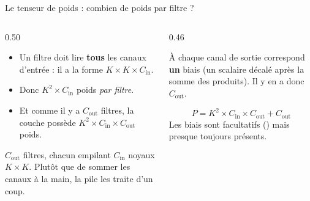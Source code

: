 \begin{frame}{Le tenseur de poids : combien de poids par filtre ?}
\begin{columns}[t]
\begin{column}{0.50\textwidth}
\begin{itemize}
  \item Un filtre doit lire \textbf{tous} les canaux d'entrée :
  il a la forme $K \times K \times C_{\text{in}}$.
  \item Donc $K^2 \times C_{\text{in}}$ poids \emph{par filtre}.
  \item Et comme il y a $C_{\text{out}}$ filtres, la couche possède
  $K^2 \times C_{\text{in}} \times C_{\text{out}}$ poids.
\end{itemize}
\begin{kbox}
$C_{\text{out}}$ filtres, chacun empilant $C_{\text{in}}$ noyaux $K \times K$.
Plutôt que de sommer les canaux à la main, la pile les traite d'un coup.
\end{kbox}
\end{column}
\begin{column}{0.46\textwidth}
\begin{wbox}
À chaque canal de sortie correspond \textbf{un} biais (un scalaire décalé
après la somme des produits). Il y en a donc $C_{\text{out}}$.
\end{wbox}
\begin{ebox}
\[
\boxed{\,P = K^2 \times C_{\text{in}} \times C_{\text{out}} + C_{\text{out}}\,}
\]
Les biais sont facultatifs () mais presque toujours présents.
\end{ebox}
\end{column}
\end{columns}
\end{frame}

